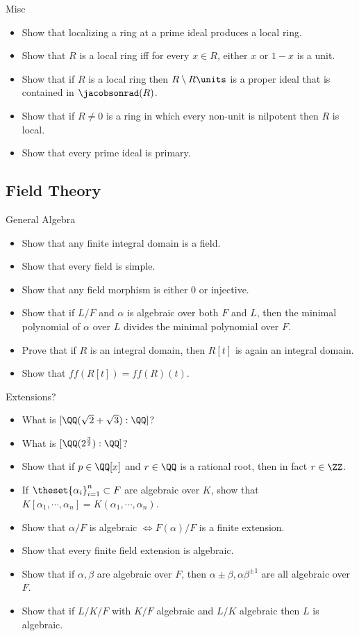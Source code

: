 Misc

\begin{itemize}
\tightlist
\item
  Show that localizing a ring at a prime ideal produces a local ring.
\item
  Show that \(R\) is a local ring iff for every \(x\in R\), either \(x\)
  or \(1-x\) is a unit.
\item
  Show that if \(R\) is a local ring then \(R\setminus R\units\) is a
  proper ideal that is contained in \(\jacobsonrad(R)\).
\item
  Show that if \(R\neq 0\) is a ring in which every non-unit is
  nilpotent then \(R\) is local.
\item
  Show that every prime ideal is primary.
\end{itemize}

\hypertarget{field-theory-1}{%
\subsection{Field Theory}\label{field-theory-1}}

General Algebra

\begin{itemize}
\tightlist
\item
  Show that any finite integral domain is a field.
\item
  Show that every field is simple.
\item
  Show that any field morphism is either 0 or injective.
\item
  Show that if \(L/F\) and \(\alpha\) is algebraic over both \(F\) and
  \(L\), then the minimal polynomial of \(\alpha\) over \(L\) divides
  the minimal polynomial over \(F\).
\item
  Prove that if \(R\) is an integral domain, then \(R[t]\) is again an
  integral domain.
\item
  Show that \(ff(R[t]) = ff(R)(t)\).
\end{itemize}

Extensions?

\begin{itemize}
\tightlist
\item
  What is \([\QQ(\sqrt 2 + \sqrt 3): \QQ]\)?
\item
  What is \([\QQ(2^{3\over 2}) : \QQ]\)?
\item
  Show that if \(p\in \QQ[x]\) and \(r\in \QQ\) is a rational root, then
  in fact \(r\in \ZZ\).
\item
  If \(\theset{\alpha_i}_{i=1}^n \subset F\) are algebraic over \(K\),
  show that
  \(K[\alpha_1, \cdots, \alpha_n] = K(\alpha_1, \cdots, \alpha_n)\).
\item
  Show that \(\alpha/F\) is algebraic \(\iff F(\alpha)/F\) is a finite
  extension.
\item
  Show that every finite field extension is algebraic.
\item
  Show that if \(\alpha, \beta\) are algebraic over \(F\), then
  \(\alpha\pm \beta, \alpha\beta^{\pm 1}\) are all algebraic over \(F\).
\item
  Show that if \(L/K/F\) with \(K/F\) algebraic and \(L/K\) algebraic
  then \(L\) is algebraic.
\end{itemize}

